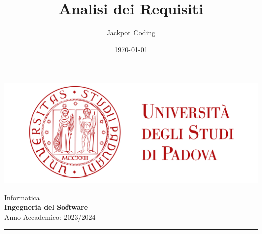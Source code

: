 \documentclass[5pt]{article}
\title{Analisi dei Requisiti}
\author{Jackpot Coding}
\date{\today}
\begin{document}


    \vspace{8pt}
    \includegraphics[scale=0.2]{UNIPDFull.png}

\vspace{30pt}

\begin{minipage}[t]{0.48\textwidth}
        \begin{flushleft}
            Informatica\\
            \vspace{5pt}
            \textbf{\LARGE Ingegneria del Software}\\
            Anno Accademico: 2023/2024
        \end{flushleft}
\end{minipage}


\vspace{5px}


\rule{\textwidth}{5pt}
\end{document}
